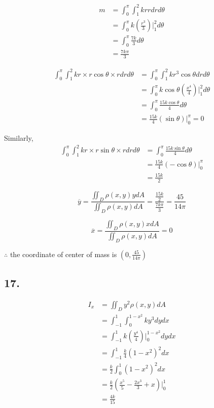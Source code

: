 \documentclass{article}
\begin{document}
   $$\begin{aligned}
     m &= \int_0^\pi \int_1^2 kr r dr d\theta \\
     &= \int_0^{\pi} k(\frac{r^3}{3})\biggl|_1^2 d\theta \\
     &= \int_0^{\pi} \frac{7k}{3} d\theta \\
     &= \frac{7k\pi}{3}
   \end{aligned}$$

   $$\begin{aligned}
     \int_0^\pi \int_1^2 kr \times r\cos \theta \times rdr d\theta &= \int_0^\pi \int_1^2 kr^3\cos \theta dr d\theta \\
     &= \int_0^\pi k\cos \theta(\frac{x^4}{4})\biggl|_1^2 d\theta \\
     &= \int_0^\pi \frac{15k\cos \theta}{4} d\theta \\
     &= \frac{15k}{4} (\sin \theta)\biggl|_0^\pi = 0
   \end{aligned}$$

   Similarly,
   $$\begin{aligned}
     \int_0^\pi \int_1^2 kr \times r\sin \theta \times rdrd\theta &= \int_0^\pi \frac{15k\sin \theta}{4}d\theta \\
     &= \frac{15k}{4} (-\cos \theta)\biggl|_0^\pi \\
     &= \frac{15k}{2}
   \end{aligned}$$

   $$\overline y = \frac{\iint_D \rho(x, y) y dA}{\iint_D \rho(x, y) dA} = \frac{\frac{15k}{2}}{\frac{7k\pi}{3}} = \frac{45}{14\pi}$$

   $$\overline x = \frac{\iint_D \rho(x, y) x dA}{\iint_D \rho(x, y) dA} = 0$$

   $\therefore$ the coordinate of center of mass is $(0, \frac{45}{14\pi})$

  \subsection*{17. }
   $$\begin{aligned}
     I_x &= \iint_D y^2 \rho(x, y) dA \\
     &= \int_{-1}^1 \int_0^{1-x^2} ky^3 dy dx \\
     &= \int_{-1}^1 k(\frac{y^4}{4})\biggl|_0^{1-x^2} dy dx \\
     &= \int_{-1}^1 \frac{k}{4}(1-x^2)^2 dx \\
     &= \frac k 2 \int_0^1 (1-x^2)^2 dx \\
     &= \frac k 2 (\frac{x^5}{5} - \frac{2x^3}{3} + x)\biggl|_0^1 \\
     &= \frac{4k}{15}
   \end{aligned}$$
\end{document}
